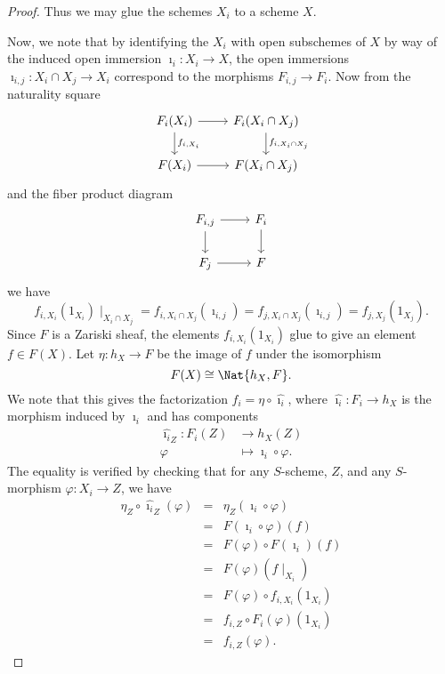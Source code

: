 \documentclass[10pt]{amsart}
\begin{document}
\begin{thm}
\begin{proof}
    Thus we may glue the schemes $X_i$ to a scheme $X$.%

    Now, we note that by identifying the $X_i$ with open subschemes of $X$ by way of the induced open immersion $\imath_i : X_i \rightarrow X$, the open immersions $\imath_{i,j} : X_i \cap X_j \rightarrow X_i$ correspond to the morphisms $F_{i,j} \rightarrow F_i$.
    Now from the naturality square
    $$\begin{tikzcd}
      F_i(X_i) \arrow{r}\arrow{d}{f_{i,X_i}}& F_i(X_i \cap X_j)\arrow{d}{f_{i,X_i \cap X_j}}\\
      F(X_i) \arrow{r} & F(X_i \cap X_j)
    \end{tikzcd}$$
    and the fiber product diagram
    $$\begin{tikzcd}
      F_{i,j} \arrow{r}\arrow{d}& F_i\arrow{d}\\
      F_j \arrow{r} & F
    \end{tikzcd}$$
    we have
    $$f_{i,X_i}(1_{X_i})\mid_{X_i \cap X_j} = f_{i,X_i \cap X_j}(\imath_{i,j}) = f_{j,X_i \cap X_j}(\imath_{i,j}) = f_{j, X_j}(1_{X_j}).$$
    Since $F$ is a Zariski sheaf, the elements $f_{i,X_i}(1_{X_i})$ glue to give an element $f \in F(X)$.
    Let $\eta : h_X \rightarrow F$ be the image of $f$ under the isomorphism
    $$F(X) \cong \Nat{h_X, F}.$$
    We note that this gives the factorization $f_i = \eta \circ \hat{\imath_i}$, where $\hat{\imath_i} : F_i \rightarrow h_X$ is the morphism induced by $\imath_i$ and has components
    \begin{align*}
      \hat{\imath_i}_Z \colon F_i(Z) &\rightarrow h_X(Z)\\
      \varphi &\mapsto \imath_i \circ \varphi.
    \end{align*}
    The equality is verified by checking that for any $S$-scheme, $Z$, and any $S$-morphism $\varphi : X_i \rightarrow Z$, we have
    \begin{eqnarray*}
      \eta_Z \circ \hat{\imath_i}_Z(\varphi) &=& \eta_Z(\imath_i \circ \varphi)\\
      &=& F(\imath_i \circ \varphi)(f)\\
      &=& F(\varphi) \circ F(\imath_i)(f)\\
      &=& F(\varphi)(f\mid_{X_i})\\
      &=& F(\varphi) \circ f_{i,X_i}(1_{X_i})\\
      &=& f_{i,Z} \circ F_i(\varphi)(1_{X_i})\\
      &=& f_{i,Z}(\varphi).
    \end{eqnarray*}
    


\end{proof}
\end{thm}
\end{document}
